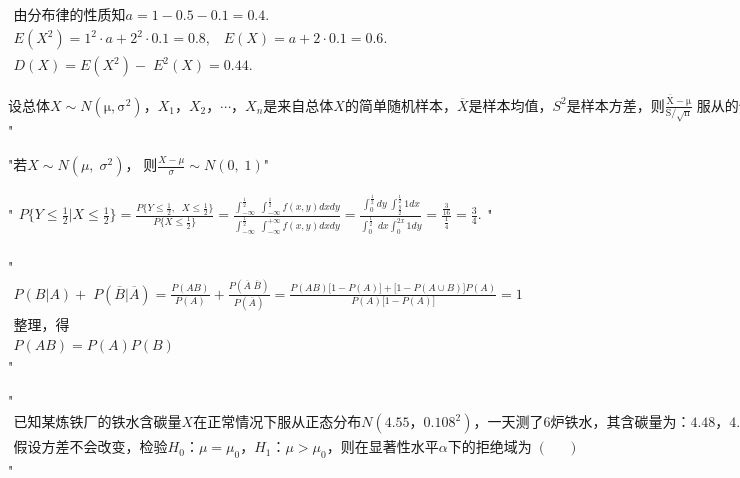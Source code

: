 
$\begin{array}{l}\mathrm{由分布律的性质知}a=1-0.5-0.1=0.4.\\E(X^2)=1^2\cdot a+2^2\cdot0.1=0.8,\;\;\;E(X)=a+2\cdot0.1=0.6.\\D(X)=E(X^2)-\;E^2(X)=0.44.\end{array}$


$\mathrm{设总体}X\sim N\left(\mathrm\mu,\mathrm\sigma^2\right)，X_1，X_2，\cdots，X_n\mathrm{是来自总体}X\mathrm{的简单随机样本}，\overline X\mathrm{是样本均值}，S^2\mathrm{是样本方差}，\mathrm 则\frac{\overline{\mathrm X}-\mathrm\mu}{\mathrm S/\sqrt{\mathrm n}}\;\mathrm{服从的分布为}\;\left(\;\;\;\;\right)$"


"$若X\sim N(\mu,\;\sigma^2)，\;则\frac{X-\mu}\sigma\sim N(0,\;1)$"


"$\begin{array}{l}P\{Y\leq\frac12\vert X\leq\frac12\}=\frac{P\{Y\leq\frac12,\;\;X\leq\frac12\}}{P\{X\leq\frac12\}}=\frac{\int_{-\infty}^{\displaystyle\frac12}\;\int_{-\infty}^\frac12f(x,y)dxdy}{\int_{-\infty}^\frac12\;\int_{-\infty}^{+\infty}f(x,y)dxdy}=\frac{\int_0^{\displaystyle\frac12}dy\;\int_
{\displaystyle\frac y2}^\frac121dx}{\int_0^\frac12\;dx\int_0^{2x}1dy}=\frac{\displaystyle\frac3{16}}{\displaystyle\frac14}=\frac34.\\\end{array}$"


"$\begin{array}{l}P(B\vert A)+\;P(\overline B\vert\overline A)=\frac{P(AB)}{P(A)}+\frac{P(\overline A\;\overline B)}{P(\overline A)}=\frac{P(AB)\lbrack1-P(A)\rbrack+\lbrack1-P(A\cup B)\rbrack P(A)}{P(A)\lbrack1-P(A)\rbrack}=1\\\mathrm{整理}，得\\P(AB)=P(A)P(B)\end{array}$"


"$\begin{array}{l}\mathrm{已知某炼铁厂的铁水含碳量}X\mathrm{在正常情况下服从正态分布}N\left(4.55，0.108^2\right)，\mathrm{一天测了}6\mathrm{炉铁水}，\mathrm{其含碳量为}：4.48，4.40，4.46，4.50，4.44，4.43，\\\mathrm{假设方差不会改变}，\mathrm{检验}H_0：\mu=\mu_0，H_1：\mu>\mu_0，\mathrm{则在显著性水平}\alpha\mathrm{下的拒绝域为}\;\left(\;\;\;\;\;\right)\end{array}$"

















